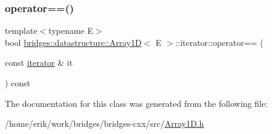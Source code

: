 \subsubsection{\texorpdfstring{operator==()}{operator==()}}
{\footnotesize\ttfamily template$<$typename E$>$ \\
bool \hyperlink{classbridges_1_1datastructure_1_1_array1_d}{bridges\+::datastructure\+::\+Array1D}$<$ E $>$\+::iterator\+::operator== (\begin{DoxyParamCaption}\item[{const \hyperlink{classbridges_1_1datastructure_1_1_array1_d_1_1iterator}{iterator} \&}]{it }\end{DoxyParamCaption}) const\hspace{0.3cm}{\ttfamily [inline]}}



The documentation for this class was generated from the following file\+:\begin{DoxyCompactItemize}
\item 
/home/erik/work/bridges/bridges-\/cxx/src/\hyperlink{_array1_d_8h}{Array1\+D.\+h}\end{DoxyCompactItemize}
